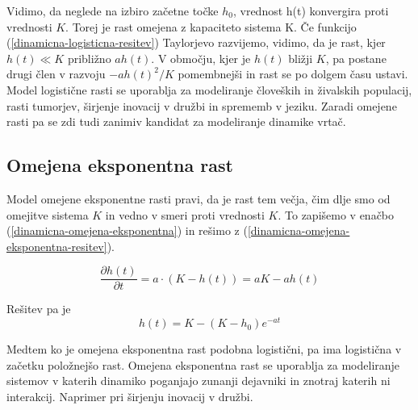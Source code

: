\documentclass[a4paper, oneside, 12pt]{book}
\begin{document}
          Vidimo, da neglede na izbiro začetne točke $h_0$, vrednost h(t) konvergira proti vrednosti $K$. Torej je rast omejena z kapaciteto sistema K.
          Če funkcijo (\ref{dinamicna-logisticna-resitev}) Taylorjevo razvijemo, vidimo, da je rast, kjer $h(t) \ll K$ približno $a h(t)$. V območju, kjer je $h(t)$ bližji $K$, pa postane drugi člen v razvoju $-a h(t)^2 / K$ pomembnejši in rast se po dolgem času ustavi.
          Model logistične rasti se uporablja za modeliranje človeških in živalskih populacij, rasti tumorjev, širjenje inovacij v družbi in sprememb v jeziku. Zaradi omejene rasti pa se zdi tudi zanimiv kandidat za modeliranje dinamike vrtač.


          \subsection{Omejena eksponentna rast}

          Model omejene eksponentne rasti pravi, da je rast tem večja, čim dlje smo od omejitve sistema $K$ in vedno v smeri proti vrednosti $K$. To zapišemo v enačbo (\ref{dinamicna-omejena-eksponentna}) in rešimo z (\ref{dinamicna-omejena-eksponentna-resitev}).

          \begin{equation}
            \frac{\partial h(t)}{\partial t} = a \cdot ( K - h(t) ) = a K - a h(t)
            \label{dinamicna-omejena-eksponentna}
          \end{equation}

          Rešitev pa je
          \begin{equation}
            h(t) = K - (K - h_0) e^{-a t}
            \label{dinamicna-omejena-eksponentna-resitev}
          \end{equation}

            Medtem ko je omejena eksponentna rast podobna logistični, pa ima logistična v začetku položnejšo rast. Omejena eksponentna rast se uporablja za modeliranje sistemov v katerih dinamiko poganjajo zunanji dejavniki in znotraj katerih ni interakcij. Naprimer pri širjenju inovacij v družbi.
\end{document}
